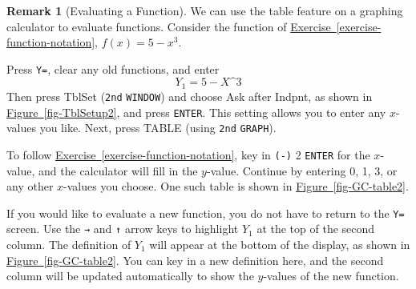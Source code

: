\documentclass[10pt,]{book}
\theoremstyle{plain}
\theoremstyle{definition}
\newtheorem{remark}[theorem]{Remark}
\theoremstyle{definition}
\theoremstyle{definition}
\theoremstyle{definition}
\numberwithin{equation}{part}
\newlength{\panelmax}
\begin{document}
\begin{remark}[Evaluating a Function]\label{remark-4}
We can use the table feature on a graphing calculator to evaluate functions. Consider the function of \hyperref[exercise-function-notation]{Exercise~\ref{exercise-function-notation}}, \(f(x) = 5 - x^3\).%
\par
Press \lstinline?Y=?, clear any old functions, and enter%
\begin{equation*}
Y_1 = 5-X \text{^} 3
\end{equation*}
Then press TblSet (\lstinline?2nd? \lstinline?WINDOW?) and choose Ask after Indpnt, as shown in \hyperref[fig-TblSetup2]{Figure~\ref{fig-TblSetup2}}, and press \lstinline?ENTER?. This setting allows you to enter any \(x\)-values you like. Next, press TABLE (using \lstinline?2nd? \lstinline?GRAPH?).%
\par
To follow \hyperref[exercise-function-notation]{Exercise~\ref{exercise-function-notation}}, key in \lstinline?(-)? 2 \lstinline?ENTER? for the \(x\)-value, and the calculator will fill in the \(y\)-value. Continue by entering 0, 1, 3, or any other \(x\)-values you choose. One such table is shown in \hyperref[fig-GC-table2]{Figure~\ref{fig-GC-table2}}.%
\par
If you would like to evaluate a new function, you do not have to return to the \lstinline?Y=? screen. Use the \lstinline?→? and \lstinline?↑? arrow keys to highlight \(Y_1\) at the top of the second column. The definition of \(Y_1\) will appear at the bottom of the display, as shown in \hyperref[fig-GC-table2]{Figure~\ref{fig-GC-table2}}. You can key in a new definition here, and the second column will be updated automatically to show the \(y\)-values of the new function. %
{%
\setlength{\panelmax}{0pt}
\newsavebox{\panelboxBAimage}
}
\end{remark}
\end{document}
